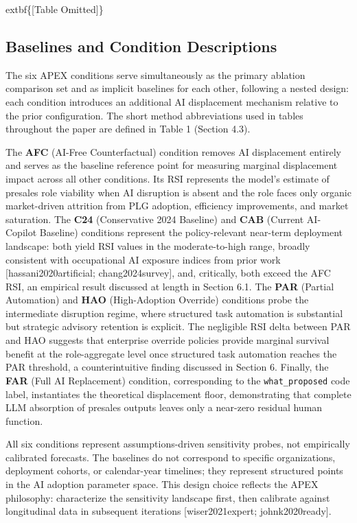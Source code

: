 \documentclass[10pt, conference]{IEEEtran}
\begin{document}
	extbf\{[Table Omitted]\}

\subsection{Baselines and Condition Descriptions}

\label{sec:baselines_and_condition_descriptions}

The six APEX conditions serve simultaneously as the primary ablation comparison set and as implicit baselines for each other, following a nested design: each condition introduces an additional AI displacement mechanism relative to the prior configuration. The short method abbreviations used in tables throughout the paper are defined in Table 1 (Section 4.3).

The \textbf{AFC} (AI-Free Counterfactual) condition removes AI displacement entirely and serves as the baseline reference point for measuring marginal displacement impact across all other conditions. Its RSI represents the model's estimate of presales role viability when AI disruption is absent and the role faces only organic market-driven attrition from PLG adoption, efficiency improvements, and market saturation. The \textbf{C24} (Conservative 2024 Baseline) and \textbf{CAB} (Current AI-Copilot Baseline) conditions represent the policy-relevant near-term deployment landscape: both yield RSI values in the moderate-to-high range, broadly consistent with occupational AI exposure indices from prior work [hassani2020artificial; chang2024survey], and, critically, both exceed the AFC RSI, an empirical result discussed at length in Section 6.1. The \textbf{PAR} (Partial Automation) and \textbf{HAO} (High-Adoption Override) conditions probe the intermediate disruption regime, where structured task automation is substantial but strategic advisory retention is explicit. The negligible RSI delta between PAR and HAO suggests that enterprise override policies provide marginal survival benefit at the role-aggregate level once structured task automation reaches the PAR threshold, a counterintuitive finding discussed in Section 6. Finally, the \textbf{FAR} (Full AI Replacement) condition, corresponding to the \texttt{what\_proposed} code label, instantiates the theoretical displacement floor, demonstrating that complete LLM absorption of presales outputs leaves only a near-zero residual human function.

All six conditions represent assumptions-driven sensitivity probes, not empirically calibrated forecasts. The baselines do not correspond to specific organizations, deployment cohorts, or calendar-year timelines; they represent structured points in the AI adoption parameter space. This design choice reflects the APEX philosophy: characterize the sensitivity landscape first, then calibrate against longitudinal data in subsequent iterations [wiser2021expert; johnk2020ready].
\end{document}
